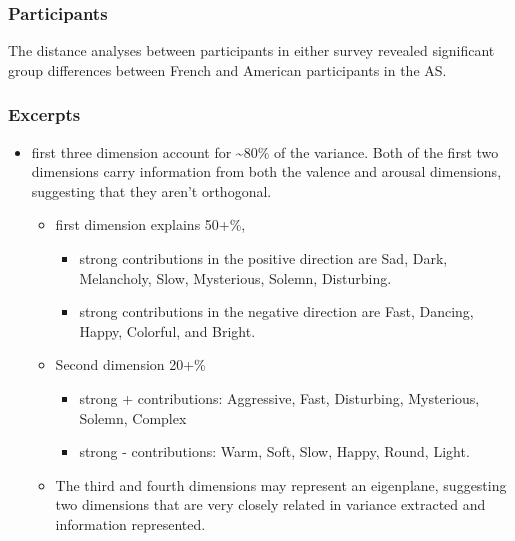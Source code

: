 \documentclass[
  english,
  man]{apa6}
\providecommand{\tightlist}{%
  \setlength{\itemsep}{0pt}\setlength{\parskip}{0pt}}
\begin{document}
\hypertarget{participants-2}{%
\subsubsection{Participants}\label{participants-2}}

The distance analyses between participants in either survey revealed significant group differences between French and American participants in the AS.

\hypertarget{excerpts-1}{%
\subsubsection{Excerpts}\label{excerpts-1}}

\begin{itemize}
\tightlist
\item
  first three dimension account for \textasciitilde80\% of the variance. Both of the first two dimensions carry information from both the valence and arousal dimensions, suggesting that they aren't orthogonal.

  \begin{itemize}
  \tightlist
  \item
    first dimension explains 50+\%,

    \begin{itemize}
    \tightlist
    \item
      strong contributions in the positive direction are Sad, Dark, Melancholy, Slow, Mysterious, Solemn, Disturbing.
    \item
      strong contributions in the negative direction are Fast, Dancing, Happy, Colorful, and Bright.
    \end{itemize}
  \item
    Second dimension 20+\%

    \begin{itemize}
    \tightlist
    \item
      strong + contributions: Aggressive, Fast, Disturbing, Mysterious, Solemn, Complex
    \item
      strong - contributions: Warm, Soft, Slow, Happy, Round, Light.
    \end{itemize}
  \item
    The third and fourth dimensions may represent an eigenplane, suggesting two dimensions that are very closely related in variance extracted and information represented.
  \end{itemize}
\end{itemize}
\end{document}
